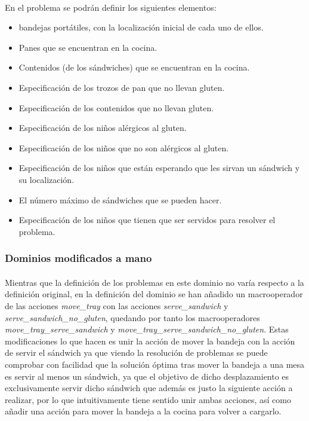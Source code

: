 \documentclass{article}
\begin{document}
\paragraph{}
En el problema se podrán definir los siguientes elementos:
\begin{itemize}
    \item bandejas portátiles, con la localización inicial de cada uno de ellos.
    \item Panes que se encuentran en la cocina.
    \item Contenidos (de los sándwiches) que se encuentran en la cocina.
    \item Especificación de los trozos de pan que no llevan gluten.
    \item Especificación de los contenidos que no llevan gluten.
    \item Especificación de los niños alérgicos al gluten.
    \item Especificación de los niños que no son alérgicos al gluten.
    \item Especificación de los niños que están esperando que les sirvan un sándwich y su localización.
    \item El número máximo de sándwiches que se pueden hacer.
    \item Especificación de los niños que tienen que ser servidos para resolver el problema.
\end{itemize}


\subsubsection{Dominios modificados a mano}

\paragraph{}
Mientras que la definición de los problemas en este dominio no varía
respecto a la definición original, en la definición del dominio se han añadido un
macrooperador de las acciones \textit{move\_tray} con las acciones
\textit{serve\_sandwich} y
\textit{serve\_sandwich\_no\_gluten}, quedando por tanto los macrooperadores \\
\textit{move\_tray\_serve\_sandwich} y \textit{move\_tray\_serve\_sandwich\_no\_gluten}. Estas
modificaciones lo que hacen es unir la acción de mover la bandeja con la acción de
servir el sándwich ya que viendo la resolución de problemas se puede comprobar
con facilidad que la solución óptima tras mover la bandeja a una mesa es servir
al menos un sándwich, ya que el objetivo de dicho desplazamiento es
exclusivamente servir dicho sándwich que además es justo la siguiente acción a realizar,
por lo que intuitivamente tiene sentido unir ambas acciones, así como añadir
una acción para mover la bandeja a la cocina para volver a cargarlo.
\end{document}

